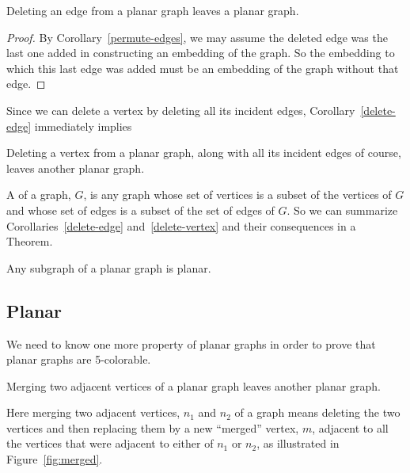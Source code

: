 \begin{corollary}\label{delete-edge}
Deleting an edge from a planar graph leaves a planar graph.

\begin{proof}
  By Corollary~\ref{permute-edges}, we may assume the deleted edge was the
  last one added in constructing an embedding of the graph.  So the
  embedding to which this last edge was added must be an embedding of the
  graph without that edge.
\end{proof}

\end{corollary}

Since we can delete a vertex by deleting all its incident edges,
Corollary~\ref{delete-edge} immediately implies

\begin{corollary}\label{delete-vertex}
Deleting a vertex from a planar graph, along with all its incident
edges of course, leaves another planar graph.
\end{corollary}

A  of a graph, $G$, is any graph whose set of vertices is a
subset of the vertices of $G$ and whose set of edges is a subset of the
set of edges of $G$.  So we can summarize Corollaries~\ref{delete-edge}
and~\ref{delete-vertex} and their consequences in a Theorem.

\begin{theorem}\label{planar-subgraph}
  Any subgraph of a planar graph is planar.
\end{theorem}

\subsection{Planar }

We need to know one more property of planar graphs in order to prove that
planar graphs are 5-colorable.

\begin{lemma}\label{mergelem}
Merging two adjacent vertices of a planar graph leaves another planar graph.
\end{lemma}

Here merging two adjacent vertices, $n_1$ and $n_2$ of a graph means
deleting the two vertices and then replacing them by a new ``merged''
vertex, $m$, adjacent to all the vertices that were adjacent to either of
$n_1$ or $n_2$, as illustrated in Figure~\ref{fig:merged}.

